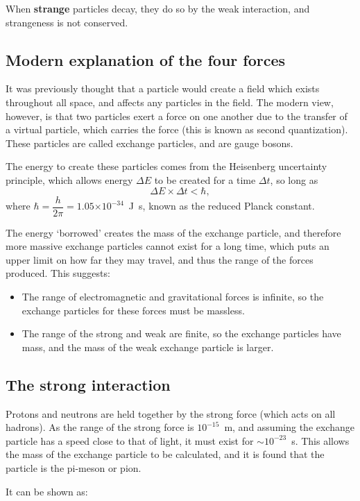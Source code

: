 \documentclass[a4paper,12pt]{article}
\providecommand{\e}[1]{\ensuremath{\times 10^{#1}}}
\begin{document}
When {\bf strange} particles decay, they do so by the weak interaction, and strangeness is not conserved.

\subsection{Modern explanation of the four forces}

It was previously thought that a particle would create a field which exists throughout all space, and affects any particles in the field.  The modern view, however, is that two particles exert a force on one another due to the transfer of a virtual particle, which carries the force (this is known as second quantization).  These particles are called exchange particles, and are gauge bosons.

The energy to create these particles comes from the Heisenberg uncertainty principle, which allows energy $\Delta E$ to be created for a time $\Delta t$, so long as
\[\Delta E \times \Delta t < \hbar,\]
where $\hbar=\dfrac{h}{2\pi}=1.05\e{-34}$~J~s, known as the reduced Planck constant.

The energy `borrowed' creates the mass of the exchange particle, and therefore more massive exchange particles cannot exist for a long time, which puts an upper limit on how far they may travel, and thus the range of the forces produced.  This suggests:
\begin{itemize}
\item The range of electromagnetic and gravitational forces is infinite, so the exchange particles for these forces must be massless.
\item The range of the strong and weak are finite, so the exchange particles have mass, and the mass of the weak exchange particle is larger.
\end{itemize}

\subsection{The strong interaction}

Protons and neutrons are held together by the strong force (which acts on all hadrons).  As the range of the strong force is $10^{-15}$~m, and assuming the exchange particle has a speed close to that of light, it must exist for $\sim 10^{-23}$~s.  This allows the mass of the exchange particle to be calculated, and it is found that the particle is the pi-meson or pion.

It can be shown as:\\
\end{document}

